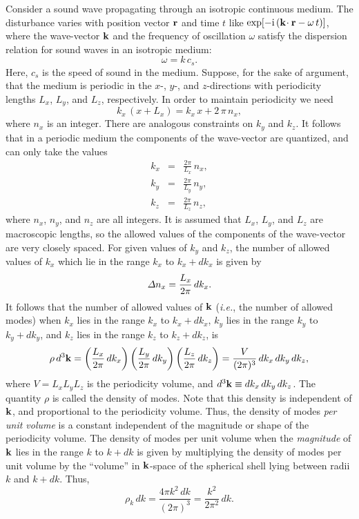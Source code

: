 Consider a sound wave propagating through an isotropic continuous medium.
The  disturbance varies with position vector ${\bf r}$ and time $t$ like
$\exp[-{\rm i}\,({\bf k}\!\cdot{\bf r} - \omega \,t)]$, where the wave-vector ${\bf k}$ and
the frequency of oscillation $\omega$ satisfy the dispersion relation for sound waves in
an isotropic medium:
\begin{equation}\label{e7.146}
\omega = k \,c_s.
\end{equation}
Here, $c_s$ is the speed of sound in the medium. Suppose, for the sake
of argument,  that the medium is periodic in
the $x$-, $y$-, and $z$-directions with periodicity lengths $L_x$, $L_y$, and $L_z$, respectively.
In order to maintain periodicity we need
\begin{equation}
k_x\, (x+ L_x) = k_x\, x + 2\,\pi\, n_x,
\end{equation}
where $n_x$ is an integer. There are analogous constraints on $k_y$ and $k_z$. It follows that
in a periodic medium the components of the wave-vector are quantized, and can only take the
values
\begin{eqnarray}
k_x &=& \frac{2\pi}{L_x} \,n_x, \\[0.5ex]
k_y &=& \frac{2\pi}{L_y} \,n_y, \\[0.5ex]
k_z &=& \frac{2\pi}{L_z} \,n_z, 
\end{eqnarray}
where $n_x$, $n_y$, and $n_z$ are all integers. It is assumed that $L_x$, $L_y$, and $L_z$ are
macroscopic lengths, so the allowed values of the components of the wave-vector are very closely
spaced.
 For given values of $k_y$ and $k_z$, the number of
allowed values of $k_x$ which lie in the range $k_x$ to $k_x + d k_x$ is given by
\begin{equation}
{\mit\Delta} n_x = \frac{L_x}{2\pi} \,dk_x.
\end{equation}
It follows that the number of allowed values of ${\bf k}$ ({\em i.e.}, the number of allowed
modes) when $k_x$ lies in the range $k_x$ to $k_x + d k_x$,
 $k_y$ lies in the range $k_y$ to $k_y + d k_y $, and 
 $k_z$ lies in the range $k_z$ to $k_z + d k_z $, is
\begin{equation}\label{e7.150}
\rho\, d^3{\bf k} = \left(\frac{L_x}{2\pi}\,dk_x\right)
 \left(\frac{L_y}{2\pi}\,dk_y\right) \left(\frac{L_z}{2\pi}\,dk_z\right)= 
\frac{V}{(2\pi)^3}\, dk_x\, dk_y \,dk_z,
\end{equation}
where $V = L_x L_y L_z$ is the periodicity volume, and
$d^3{\bf k}\equiv dk_x\, dk_y \,dk_z$. The quantity $\rho$ is called the density of modes.
Note that this density is independent of ${\bf k}$, and proportional to the periodicity
volume. Thus, the density of modes {\em per unit volume}\/ is a constant independent of the magnitude
or shape of the periodicity
volume. The density of modes per unit volume when the {\em magnitude}\/ of ${\bf k}$ lies in
the range $k$ to $k+dk$ is given by multiplying the density of modes per unit volume by
the ``volume'' in ${\bf k}$-space of the spherical shell lying between radii $k$ and $k+ dk$.
Thus,
\begin{equation}
\rho_k \,dk = \frac{4\pi k^2\,dk}{(2\pi)^3} = \frac{k^2}{2 \pi^2} \,dk.
\end{equation}

